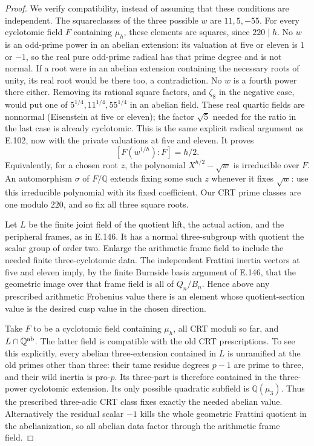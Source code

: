 \begin{proof}
We verify compatibility, instead of assuming that these conditions
are independent. The squareclasses of the three possible \(w\)
are \(11,5,-55\). For every cyclotomic field \(F\) containing
\(\mu_h\), these elements are squares, since \(220\mid h\).
No \(w\) is an odd-prime power in an abelian extension: its
valuation at five or eleven is \(1\) or \(-1\), so the real
pure odd-prime radical has that prime degree and is not normal.
If a root were in an abelian extension containing the necessary
roots of unity, its real root would be there too, a contradiction.
No \(w\) is a fourth power there either. Removing its rational
square factors, and \(\zeta_8\) in the negative case, would put
one of \(5^{1/4},11^{1/4},55^{1/4}\) in an abelian field.
These real quartic fields are nonnormal (Eisenstein at five or
eleven); the factor \(\sqrt5\) needed for the ratio in the
last case is already cyclotomic. This is the same explicit radical
argument as E.102, now with the private valuations at five and eleven.
It proves
\[
 [F(w^{1/h}):F]=h/2.
 \tag{E.151.9}
\]
Equivalently, for a chosen root \(z\), the polynomial
\(X^{h/2}-\sqrt w\) is irreducible over \(F\).
An automorphism \(\sigma\) of \(F/\mathbb Q\) extends fixing
some such \(z\) whenever it fixes \(\sqrt w\): use this
irreducible polynomial with its fixed coefficient. Our CRT prime
classes are one modulo \(220\), and so fix all three square roots.

Let \(L\) be the finite joint field of the quotient lift,
the actual action, and the peripheral frames, as in E.146.
It has a normal three-subgroup with quotient the scalar group
of order two. Enlarge the arithmetic frame field to include the
needed finite three-cyclotomic data. The independent Frattini inertia
vectors at five and eleven imply, by the finite Burnside basis
argument of E.146, that the geometric image over that frame field
is all of \(Q_n/B_n\). Hence above any prescribed arithmetic
Frobenius value there is an element whose quotient-section value
is the desired cusp value in the chosen direction.

Take \(F\) to be a cyclotomic field containing \(\mu_h\),
all CRT moduli so far, and \(L\cap\mathbb Q^{\rm ab}\).
The latter field is compatible with the old CRT prescriptions.
To see this explicitly, every abelian three-extension contained
in \(L\) is unramified at the old primes other than three:
their tame residue degrees \(p-1\) are prime to three, and
their wild inertia is pro-\(p\). Its three-part is therefore
contained in the three-power cyclotomic extension. Its only possible
quadratic subfield is \(\mathbb Q(\mu_3)\). Thus the prescribed
three-adic CRT class fixes exactly the needed abelian value.
Alternatively the residual scalar \(-1\) kills the whole geometric
Frattini quotient in the abelianization, so all abelian data factor
through the arithmetic frame field.


\end{proof}
